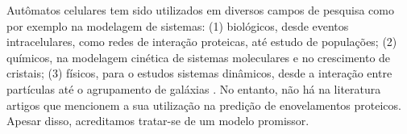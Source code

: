 Autômatos celulares tem sido utilizados em diversos campos de pesquisa como por exemplo na modelagem de sistemas: (1) biológicos, desde eventos intracelulares, como redes de interação proteicas, até estudo de populações; (2) químicos, na modelagem cinética de sistemas moleculares e no crescimento de cristais; (3) físicos, para o estudos sistemas dinâmicos, desde a interação entre partículas até o agrupamento de galáxias \cite{Ganguly2003}. No entanto, não há na literatura artigos que mencionem a sua utilização na predição de enovelamentos proteicos. Apesar disso, acreditamos tratar-se de um modelo promissor.









